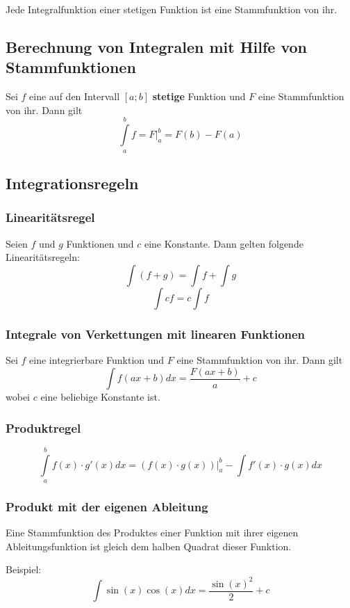 \documentclass[10pt,a4paper]{scrartcl}
\begin{document}
Jede Integralfunktion einer stetigen Funktion ist eine Stammfunktion von ihr.


\subsection{Berechnung von Integralen mit Hilfe von Stammfunktionen}

Sei $f$ eine auf den Intervall $[a;b]$ \textbf{stetige} Funktion und $F$ eine
Stammfunktion von ihr. Dann gilt
$$\int\limits_a^b f = F\Big |_a^b = F(b) - F(a)$$


\subsection{Integrationsregeln}


\subsubsection{Linearitätsregel}

Seien $f$ und $g$ Funktionen und $c$ eine Konstante. Dann gelten folgende
Linearitätsregeln:
$$\int (f+g) = \int f + \int g$$
$$\int cf = c \int f$$


\subsubsection{Integrale von Verkettungen mit linearen Funktionen}

Sei $f$ eine integrierbare Funktion und $F$ eine Stammfunktion von ihr. Dann
gilt
$$\int f(ax+b)dx = \frac{F(ax+b)}{a} + c$$
wobei $c$ eine beliebige Konstante ist.


\subsubsection{Produktregel}

$$\int\limits_a^b f(x) \cdot g'(x) dx = (f(x) \cdot g(x))\Big |_a^b
    - \int f'(x) \cdot g(x) dx$$


\subsubsection{Produkt mit der eigenen Ableitung} 

Eine Stammfunktion des Produktes einer Funktion mit ihrer eigenen
Ableitungsfunktion ist gleich dem halben Quadrat dieser Funktion.

Beispiel:
$$\int \sin(x) \cos(x) dx = \frac{\sin(x)^2}{2} + c$$
\end{document}
